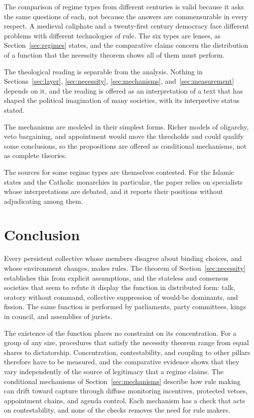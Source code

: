\documentclass[11pt,letterpaper]{article}
\theoremstyle{definition}
\theoremstyle{remark}
\begin{document}
The comparison of regime types from different centuries is valid because it asks the same questions of each, not because the answers are commensurable in every respect. A medieval caliphate and a twenty-first century democracy face different problems with different technologies of rule. The six types are lenses, as Section~\ref{sec:regimes} states, and the comparative claims concern the distribution of a function that the necessity theorem shows all of them must perform.

The theological reading is separable from the analysis. Nothing in Sections~\ref{sec:layer}, \ref{sec:necessity}, \ref{sec:mechanisms}, and~\ref{sec:measurement} depends on it, and the reading is offered as an interpretation of a text that has shaped the political imagination of many societies, with its interpretive status stated.

The mechanisms are modeled in their simplest forms. Richer models of oligarchy, veto bargaining, and appointment would move the thresholds and could qualify some conclusions, so the propositions are offered as conditional mechanisms, not as complete theories.

The sources for some regime types are themselves contested. For the Islamic states and the Catholic monarchies in particular, the paper relies on specialists whose interpretations are debated, and it reports their positions without adjudicating among them.

\section{Conclusion}
\label{sec:conclusion}

Every persistent collective whose members disagree about binding choices, and whose environment changes, makes rules. The theorem of Section~\ref{sec:necessity} establishes this from explicit assumptions, and the stateless and consensus societies that seem to refute it display the function in distributed form: talk, oratory without command, collective suppression of would-be dominants, and fission. The same function is performed by parliaments, party committees, kings in council, and assemblies of jurists.

The existence of the function places no constraint on its concentration. For a group of any size, procedures that satisfy the necessity theorem range from equal shares to dictatorship. Concentration, contestability, and coupling to other pillars therefore have to be measured, and the comparative evidence shows that they vary independently of the source of legitimacy that a regime claims. The conditional mechanisms of Section~\ref{sec:mechanisms} describe how rule making can drift toward capture through diffuse monitoring incentives, protected vetoes, appointment chains, and agenda control. Each mechanism has a check that acts on contestability, and none of the checks removes the need for rule makers.
\end{document}
